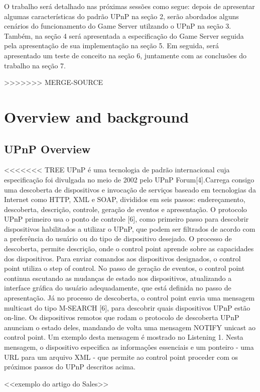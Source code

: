 \documentclass[a4paper]{sbgames}               %
\begin{document}
O trabalho será detalhado nas próximas sessões como segue: depois de apresentar algumas características do padrão UPnP na seção 2, serão abordados alguns cenários do funcionamento do Game Server utilzando o UPnP na seção 3. Também, na seção 4 será apresentada a especificação do Game Server seguida pela apresentação de sua implementação na seção 5. Em seguida, será apresentado um teste de conceito na seção 6, juntamente com as conclusões do trabalho na seção 7.

>>>>>>> MERGE-SOURCE

\section{Overview and background}
\subsection{UPnP Overview}
<<<<<<< TREE
UPnP é uma tecnologia de padrão internacional cuja especificação foi divulgada no meio de 2002 pelo UPnP Forum[4].Carrega consigo uma descoberta de dispositivos e invocação de serviços baseado em tecnologias da Internet como HTTP, XML e SOAP,  divididos em seis passos: endereçamento, descoberta, descrição, controle, geração de eventos e apresentação. O protocolo UPnP primeiro usa o ponto de controle [6], como primeiro passo para descobrir dispositivos habilitados a utilizar o UPnP, que podem ser filtrados de acordo com a preferência do usuário ou do tipo de dispositivo desejado. O processo de descoberta, permite descrição, onde o control point aprende sobre as capacidades dos dispositivos. Para enviar comandos aos dispositivos designados, o control point utiliza o step of control. No passo de geração de eventos, o control point continua escutando as mudanças de estado nos dispositivos, atualizando a interface gráfica do usuário adequadamente, que está definida no passo de apresentação. Já no processo de descoberta, o control point envia uma mensagem multicast do tipo M-SEARCH [6], para descobrir quais dispositivos UPnP estão on-line. Os dispositivos remotos que rodam o protocolo de descoberta UPnP anunciam o estado deles, mandando de volta uma mensagem NOTIFY unicast ao control point. Um exemplo desta mensagem é mostrado no Listening 1. Nesta mensagem, o dispositivo especifica as informaçôes essenciais e um ponteiro - uma URL para um arquivo XML - que permite ao control point proceder com os próximos passos do UPnP descritos acima.

<<exemplo do artigo do Sales>>
\end{document}
